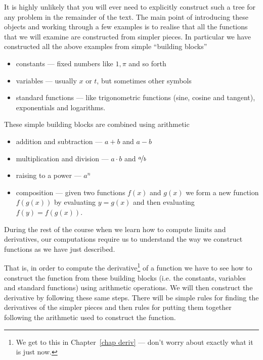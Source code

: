 It is highly unlikely that you will ever need to explicitly construct such a
tree for any problem in the remainder of the text. The main point of
introducing these objects and working through a few examples is to realise that
all the functions that we will examine are constructed from simpler pieces. In
particular we have constructed all the above examples from simple ``building
blocks''
\begin{itemize}
 \item constants --- fixed numbers like $1, \pi$ and so forth
 \item variables --- usually $x$ or $t$, but sometimes other symbols
 \item standard functions --- like trigonometric functions (sine, cosine and
tangent), exponentials and logarithms.
\end{itemize}
These simple building blocks are combined using arithmetic
\begin{itemize}
 \item addition and subtraction --- $a + b$ and $a-b$
\item multiplication and division --- $a \cdot b$ and $\nicefrac{a}{b}$
\item raising to a power --- $a^n$
\item composition --- given two functions $f(x)$ and $g(x)$ we form a
new function $f(g(x))$ by evaluating $y=g(x)$ and then evaluating $f(y) =
f(g(x))$.
\end{itemize}
During the rest of the course when we learn how to compute limits and
derivatives, our computations require us to understand the way we construct
functions as we have just described.

That is, in order to compute the derivative\footnote{We get to this in Chapter~\ref{chap
deriv} --- don't worry about exactly what it is just now.} of a function we
have to see how to construct the function from these building blocks (i.e. the
constants, variables and standard functions) using arithmetic operations. We
will then construct the derivative by following these same steps. There will be
simple rules for finding the derivatives of the simpler pieces and then rules
for putting them together following the arithmetic used to construct the function.


